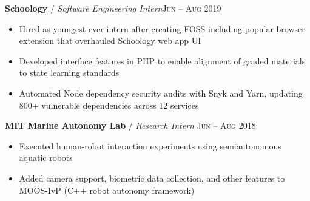 \documentclass[10pt, a4paper]{article}
\newcommand{\years}[1]{\marginnote{\scriptsize #1}}
\begin{document}
\textbf{Schoology} / \textit{Software Engineering Intern}\hfill \textsc{Jun -- Aug 2019}\\
\begin{itemize}
    \vspace{-7mm}
    \item Hired as youngest ever intern after creating FOSS including popular browser extension that overhauled Schoology web app UI
    \item Developed interface features in PHP to enable alignment of graded materials to state learning standards
    \item Automated Node dependency security audits with Snyk and Yarn, updating 800+ vulnerable dependencies across 12 services
\end{itemize}

\textbf{MIT Marine Autonomy Lab} / \textit{Research Intern} \hfill \textsc{Jun -- Aug 2018}\\
\begin{itemize}
    \vspace{-7mm}
    \item Executed human-robot interaction experiments using semiautonomous aquatic robots
    \item Added camera support, biometric data collection, and other features to MOOS-IvP (C++ robot autonomy framework)
\end{itemize}

\vspace{-7mm}
\end{document}
